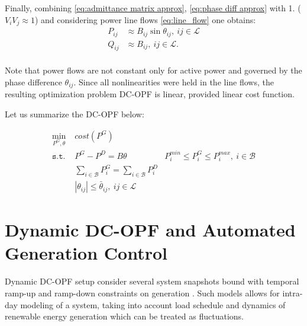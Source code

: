 Finally, combining \eqref{eq:admittance matrix approx}, \eqref{eq:phase diff approx} with 1. ($V_i V_j \approx 1$) and considering power line flows \eqref{eq:line_flow} one obtains:
\begin{equation}
    \begin{aligned}
        P_{ij} &\approx B_{ij} \sin \theta_{ij} , ~ij \in \mathcal{L} \\
        Q_{ij} &\approx B_{ij} , ~ij \in \mathcal{L}. \\
    \end{aligned}
    \label{eq:line_flow_keked}
\end{equation}

Note that power flows are not constant only for active power and governed by the phase difference $\theta_{ij}$. Since all nonlinearities were held in the line flows, the resulting optimization problem DC-OPF is linear, provided linear cost function.

Let us summarize the DC-OPF below:

\begin{equation}
    \begin{aligned}
        \min_{P^G, \theta}  & \textit{cost}(P^G) \\
        \texttt{s.t. }      & P^G - P^D = B\theta
                            & P_i^{min} \leq P_i^G \leq P_i^{max}, ~ i \in \mathcal{B} \\ 
                            & \sum_{i \in \mathcal{B}} P^G_i = \sum_{i \in \mathcal{B}} P^D_i \\
                            & |\theta_{ij}| \leq \bar{\theta}_{ij}, ~ ij \in \mathcal{L}
    \end{aligned}
    \label{eq:dc-opf}
\end{equation}

\section{Dynamic DC-OPF and Automated Generation Control}

Dynamic DC-OPF setup consider several system snapshots bound with temporal ramp-up and ramp-down constraints on generation \cite{lou2019multi, machowski2020power}. Such models allows for intra-day modeling of a system, taking into account load schedule and dynamics of renewable energy generation which can be treated as fluctuations.

